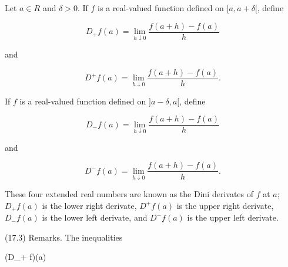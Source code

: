 Let $a \in R$ and $\delta > 0$. If $f$ is a real-valued function defined on $[a, a + \delta[$, define

$$D_+ f(a) = \lim_{h \downarrow 0} \frac{f(a + h) - f(a)}{h}$$

and

$$D^+ f(a) = \lim_{h \downarrow 0} \frac{f(a + h) - f(a)}{h}.$$

If $f$ is a real-valued function defined on $]a - \delta, a[$, define

$$D_- f(a) = \lim_{h \downarrow 0} \frac{f(a + h) - f(a)}{h}$$

and

$$D^- f(a) = \lim_{h \downarrow 0} \frac{f(a + h) - f(a)}{h}.$$

These four extended real numbers are known as the Dini derivates of $f$ at $a$; $D_+ f(a)$ is the lower right derivate, $D^+ f(a)$ is the upper right derivate, $D_- f(a)$ is the lower left derivate, and $D^- f(a)$ is the upper left derivate.

(17.3) Remarks. The inequalities

$$(D_+ f)(a)